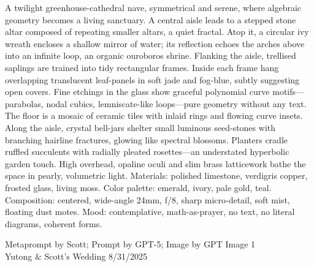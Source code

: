 \documentclass[12pt]{article}
\begin{document}
\noindent
\begin{adjustbox}{max size={\textwidth}{\textheight}}
\begin{varwidth}{\textwidth}
\RaggedRight
\footnotesize
A twilight greenhouse-cathedral nave, symmetrical and serene, where algebraic geometry becomes a living sanctuary. A central aisle leads to a stepped stone altar composed of repeating smaller altars, a quiet fractal. Atop it, a circular ivy wreath encloses a shallow mirror of water; its reflection echoes the arches above into an infinite loop, an organic ouroboros shrine. Flanking the aisle, trellised saplings are trained into tidy rectangular frames. Inside each frame hang overlapping translucent leaf-panels in soft jade and fog-blue, subtly suggesting open covers. Fine etchings in the glass show graceful polynomial curve motifs—parabolas, nodal cubics, lemniscate-like loops—pure geometry without any text. The floor is a mosaic of ceramic tiles with inlaid rings and flowing curve insets. Along the aisle, crystal bell-jars shelter small luminous seed-stones with branching hairline fractures, glowing like spectral blossoms. Planters cradle ruffled succulents with radially pleated rosettes—an understated hyperbolic garden touch. High overhead, opaline oculi and slim brass latticework bathe the space in pearly, volumetric light. Materials: polished limestone, verdigris copper, frosted glass, living moss. Color palette: emerald, ivory, pale gold, teal. Composition: centered, wide-angle 24mm, f/8, sharp micro-detail, soft mist, floating dust motes. Mood: contemplative, math-as-prayer, no text, no literal diagrams, coherent forms.
\end{varwidth}
\end{adjustbox}
\vfill
{\raggedleft\footnotesize
Metaprompt by Scott; Prompt by GPT-5; Image by GPT Image 1 \\
Yutong \& Scott's Wedding 8/31/2025\par}
\end{document}
